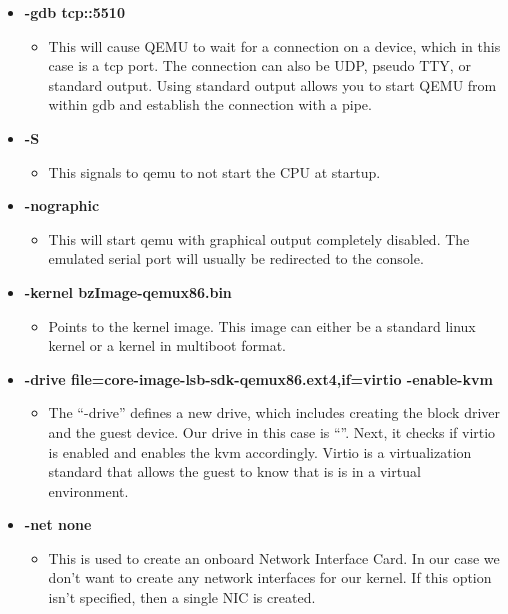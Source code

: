 \documentclass[10pt,onecolumn,draftclsnofoot]{IEEEtran} %
\begin{document}
\begin{singlespace}
  \begin{itemize}
    \item \textbf{-gdb tcp::5510}
    \begin{itemize}
      \item This will cause QEMU to wait for a connection on a device, which in this case is a tcp port. The connection can also be UDP, pseudo TTY, or standard output. Using standard output allows you to start QEMU from within gdb and establish the connection with a pipe.
    \end{itemize}

    \item \textbf{-S}
    \begin{itemize}
      \item This signals to qemu to not start the CPU at startup.
    \end{itemize}

    \item \textbf{-nographic}
    \begin{itemize}
      \item This will start qemu with graphical output completely disabled. The emulated serial port will usually be redirected to the console.
    \end{itemize}

    \item \textbf{-kernel bzImage-qemux86.bin}
    \begin{itemize}
      \item  Points to the kernel image. This image can either be a standard linux kernel or a kernel in multiboot format.
    \end{itemize}

    \item \textbf{-drive file=core-image-lsb-sdk-qemux86.ext4,if=virtio -enable-kvm}
    \begin{itemize}
      \item The “-drive” defines a new drive, which includes creating the block driver and the guest device. Our drive in this case is “”.  Next, it checks if virtio is enabled and enables the kvm accordingly. Virtio is a virtualization standard that allows the guest to know that is is in a virtual environment.
    \end{itemize}

    \item \textbf{-net none}
    \begin{itemize}
      \item This is used to create an onboard Network Interface Card. In our case we don’t want to create any network interfaces for our kernel. If this option isn’t specified, then a single NIC is created.
    \end{itemize}


\end{itemize}
\end{singlespace}
\end{document}
